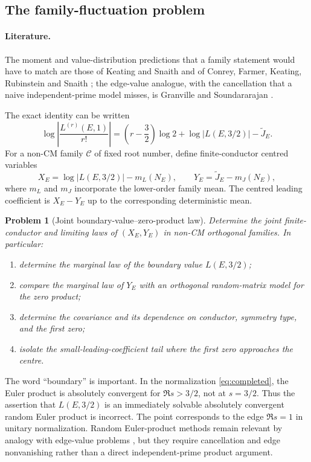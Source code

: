 \documentclass[11pt,reqno]{amsart}
\newtheorem{problem}{Problem}
\theoremstyle{remark}
\begin{document}
\subsection{The family-fluctuation problem}

\paragraph{Literature.}
The moment and value-distribution predictions that a family statement would have to match are those of Keating and Snaith \cite{KeatingSnaith2000} and of Conrey, Farmer, Keating, Rubinstein and Snaith \cite{CFKRS2005}; the edge-value analogue, with the cancellation that a naive independent-prime model misses, is Granville and Soundararajan \cite{GranvilleSoundararajan2003}.

The exact identity can be written
\begin{equation}
  \log\left|\frac{L^{(r)}(E,1)}{r!}\right|
  =\left(r-\frac32\right)\log2
   +\log|L(E,3/2)|-\widetilde J_E.
  \label{eq:centered-identity}
\end{equation}
For a non-CM family $\mathscr C$ of fixed root number, define finite-conductor centred variables
\begin{equation}
  X_E=\log|L(E,3/2)|-m_L(N_E),
  \qquad
  Y_E=\widetilde J_E-m_J(N_E),
  \label{eq:XY}
\end{equation}
where $m_L$ and $m_J$ incorporate the lower-order family mean.  The centred leading coefficient is $X_E-Y_E$ up to the corresponding deterministic mean.

\begin{problem}[Joint boundary-value--zero-product law]
Determine the joint finite-conductor and limiting laws of $(X_E,Y_E)$ in non-CM orthogonal families.  In particular:
\begin{enumerate}
  \item determine the marginal law of the boundary value $L(E,3/2)$;
  \item compare the marginal law of $Y_E$ with an orthogonal random-matrix model for the zero product;
  \item determine the covariance and its dependence on conductor, symmetry type, and the first zero;
  \item isolate the small-leading-coefficient tail where the first zero approaches the centre.
\end{enumerate}
\end{problem}

The word ``boundary'' is important.  In the normalization \eqref{eq:completed}, the Euler product is absolutely convergent for $\Re s>3/2$, not at $s=3/2$.  Thus the assertion that $L(E,3/2)$ is an immediately solvable absolutely convergent random Euler product is incorrect.  The point corresponds to the edge $\Re s=1$ in unitary normalization.  Random Euler-product methods remain relevant by analogy with edge-value problems \cite{GranvilleSoundararajan2003}, but they require cancellation and edge nonvanishing rather than a direct independent-prime product argument.
\end{document}
